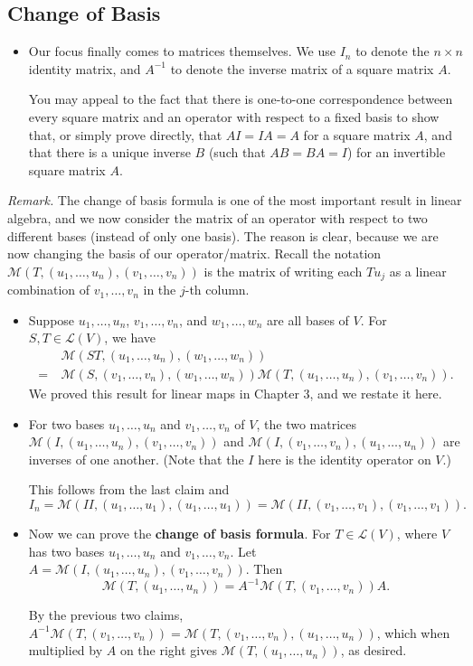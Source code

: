\documentclass[11pt]{article}
\newcommand{\LV}{\mathcal{L}(V)}
\newcommand{\M}{\mathcal{M}}
\begin{document}
\subsection{Change of Basis}
\begin{itemize}
    \item Our focus finally comes to matrices themselves. We use $I_n$ to denote the $n \times n$ identity matrix, and $A^{-1}$ to denote the inverse matrix of a square matrix $A$.

    You may appeal to the fact that there is one-to-one correspondence between every square matrix and an operator with respect to a fixed basis to show that, or simply prove directly, that $AI = IA = A$ for a square matrix $A$, and that there is a unique inverse $B$ (such that $AB = BA = I$) for an invertible square matrix $A$.
\end{itemize}
\textit{Remark.} The change of basis formula is one of the most important result in linear algebra, and we now consider the matrix of an operator with respect to two different bases (instead of only one basis). The reason is clear, because we are now changing the basis of our operator/matrix. Recall the notation $\M(T,(u_1,\dots,u_n),(v_1,\dots,v_n))$ is the matrix of writing each $Tu_j$ as a linear combination of $v_1,\dots,v_n$ in the $j$-th column.
\begin{itemize}
    \item Suppose $u_1,\dots,u_n$, $v_1,\dots,v_n$, and $w_1,\dots,w_n$ are all bases of $V$. For $S,T \in \LV$, we have 
    \begin{align*}
        & \M(ST,(u_1,\dots,u_n),(w_1,\dots,w_n)) \\ = \: & \M(S,(v_1,\dots,v_n),(w_1,\dots,w_n))\M(T,(u_1,\dots,u_n),(v_1,\dots,v_n)).
    \end{align*}
    We proved this result for linear maps in Chapter 3, and we restate it here.
    \item For two bases $u_1,\dots,u_n$ and $v_1,\dots,v_n$ of $V$, the two matrices $\M(I,(u_1,\dots,u_n),(v_1,\dots,v_n))$ and $\M(I,(v_1,\dots,v_n),(u_1,\dots,u_n))$ are inverses of one another. (Note that the $I$ here is the identity operator on $V$.)

    This follows from the last claim and \[I_n = \M(II,(u_1,\dots,u_1),(u_1,\dots,u_1)) = \M (II,(v_1,\dots,v_1),(v_1,\dots,v_1)).\]
    \item Now we can prove the \textbf{change of basis formula}. For $T \in \LV$, where $V$ has two bases $u_1,\dots,u_n$ and $v_1,\dots,v_n$. Let $A = \M(I,(u_1,\dots,u_n),(v_1,\dots,v_n))$. Then \[\M(T,(u_1,\dots,u_n)) = A^{-1}\M(T,(v_1,\dots,v_n))A.\]

    By the previous two claims, $A^{-1}\M(T,(v_1,\dots,v_n)) = \M(T,(v_1,\dots,v_n),(u_1,\dots,u_n))$, which when multiplied by $A$ on the right gives $\M(T,(u_1,\dots,u_n))$, as desired.
    \end{itemize}
\end{document}
